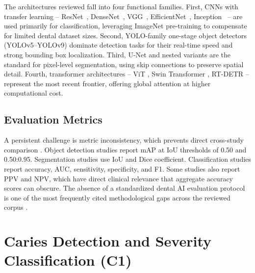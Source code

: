 \documentclass[conference]{IEEEtran}
\begin{document}
The architectures reviewed fall into four functional families. First,
CNNs with transfer learning -- ResNet~\cite{khuwaja2024ai},
DenseNet~\cite{kaushik2025densenet201,kaushik2025densenet201,ozdemir2026enhanced},
VGG~\cite{mathur2025comparative}, EfficientNet~\cite{chen2023deep},
Inception~\cite{gamal2025automated,zancan2025ai} -- are used primarily
for classification, leveraging ImageNet pre-training to compensate for
limited dental dataset sizes. Second, YOLO-family one-stage object
detectors (YOLOv5--YOLOv9)
\cite{ayhan2025detection,nassiri2025yolo,bizjak2024advancing,muresanu2024automating,pornprasertsuk2025clinical}
dominate detection tasks for their real-time speed and strong bounding
box localization. Third, U-Net and nested variants
\cite{alharbi2023detection,asci2024deep,lim2024dual,kong2024integrating,zanini2024systematic}
are the standard for pixel-level segmentation, using skip connections to
preserve spatial detail. Fourth, transformer architectures -- ViT
\cite{bhoopalan2026self}, Swin Transformer
\cite{vannistelrooij2024combining,zhang2025reliable}, RT-DETR
\cite{karamuftuo2025panoramic} -- represent the most recent frontier,
offering global attention at higher computational cost.

\subsection{Evaluation Metrics}

A persistent challenge is metric inconsistency, which prevents direct
cross-study comparison
\cite{iacob2025automated,bonfanti2025deep,khubrani2025detection,zanini2024systematic}.
Object detection studies report mAP at IoU thresholds of 0.50 and
0.50:0.95. Segmentation studies use IoU and Dice coefficient.
Classification studies report accuracy, AUC, sensitivity, specificity,
and F1. Some studies \cite{chen2023deep,bilal2024pdcnet,zancan2025ai}
also report PPV and NPV, which have direct clinical relevance that
aggregate accuracy scores can obscure. The absence of a standardized
dental AI evaluation protocol is one of the most frequently cited
methodological gaps across the reviewed corpus
\cite{iacob2025automated,luke2025accuracy,khubrani2025detection}.

\section{Caries Detection and Severity Classification (C1)}
\label{sec:caries}
\end{document}
